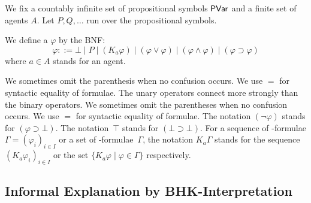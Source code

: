   We fix a countably infinite set of propositional symbols
  $\mathsf{PVar}$ and a finite set of agents $A$.
  Let $P, Q, \ldots$ run over the propositional symbols.

  \begin{definition}
   \label{formula}
   We define a  $\varphi$ by the BNF:
   \[
   \varphi ::= \bot\mid P\mid
   (K_a\varphi)\mid(\varphi\vee\varphi)\mid(\varphi\land\varphi)\mid
   (\varphi\supset\varphi)
   \]
   where $a\in A$ stands for an agent.
  \end{definition}
  We sometimes omit the parenthesis when no confusion occurs. We use $=$ for syntactic
  equality of formulae.
  \noindent The unary operators connect more strongly than the binary operators.
  We sometimes omit the parentheses when no confusion occurs. We use $=$ for syntactic
  equality of formulae.  The notation $(\neg \varphi)$ stands for $(\varphi\supset \bot)$.
  The notation~$\top$ stands for $(\bot\supset\bot)$.
  For a sequence of \iec-formulae $\Gamma = (\varphi_i)_{i\in I}$ or a set of \iec-formulae~$\Gamma$,
  the notation $K_a \Gamma$ stands for the sequence $(K_a \varphi_i)_{i\in I}$ or the set
  $\{K_a\varphi\mid \varphi\in \Gamma\}$ respectively.

  \subsection{Informal Explanation by BHK-Interpretation}
  \label{bhk}


